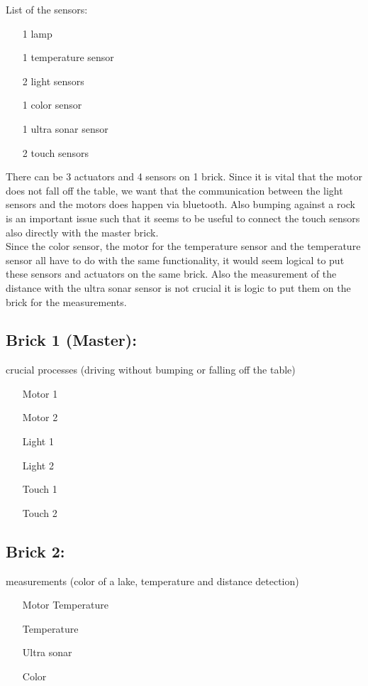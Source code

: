 \documentclass[10pt,a4paper]{article}
\begin{document}
\noindent List of the sensors:
\begin{itemize}
\item[1] lamp
\item[1] temperature sensor
\item[2] light sensors
\item[1] color sensor
\item[1] ultra sonar sensor
\item[2] touch sensors
\end{itemize}

There can be 3 actuators and 4 sensors on 1 brick.
Since it is vital that the motor does not fall off the table, we want that the communication between the light sensors and the motors does happen via bluetooth. Also bumping against a rock is an important issue such that it seems to be useful to connect the touch sensors also directly with the master brick.\\ 

Since the color sensor, the motor for the temperature sensor and the temperature sensor all have to do with the same functionality, it would seem logical to put these sensors and actuators on the same brick. Also the measurement of the distance with the ultra sonar sensor is not crucial it is logic to put them on the brick for the measurements.\\

\subsection*{Brick 1 (Master):} crucial processes (driving without bumping or falling off the table)
\begin{itemize}
\item[] Motor 1
\item[] Motor 2
\item[]
\item[] Light 1
\item[] Light 2
\item[] Touch 1
\item[] Touch 2
\end{itemize}

\subsection*{Brick 2:} measurements (color of a lake, temperature and distance detection)
\begin{itemize}
\item[] Motor Temperature
\item[]
\item[] Temperature 
\item[] Ultra sonar 
\item[] Color
\end{itemize}
\end{document}
